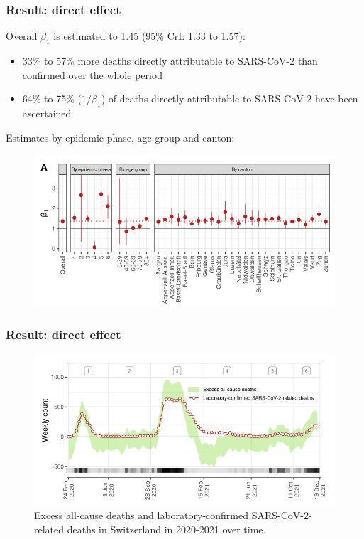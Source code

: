 \documentclass[10pt]{beamer}
\begin{document}
\begin{frame}
\frametitle{Result: direct effect}
        Overall $\beta_1$ is estimated to \alert{1.45 (95\% CrI: 1.33 to 1.57)}:
        
        \begin{itemize}
        	\item 33\% to 57\% more deaths directly attributable to SARS-CoV-2 than confirmed over the whole period
        
            \item 64\% to 75\% ($1/\beta_1$) of deaths directly attributable to SARS-CoV-2 have been ascertained
            
      \end{itemize}
  \bigskip
  
  Estimates by epidemic phase, age group and canton:
%        
%        	
%             
    \begin{figure}[t]
	\includegraphics[width=.85\linewidth ]{beta1_fig}
\end{figure}
\end{frame}

\begin{frame}
	\frametitle{Result:  direct effect}
	
	\begin{figure}[t]
		\includegraphics[width=0.9\linewidth ]{visual_comp_fig}
		\caption{Excess all-cause deaths and laboratory-confirmed SARS-CoV-2-related deaths in Switzerland in 2020-2021 over time.}
		
	\end{figure}
\end{frame}
\end{document}
